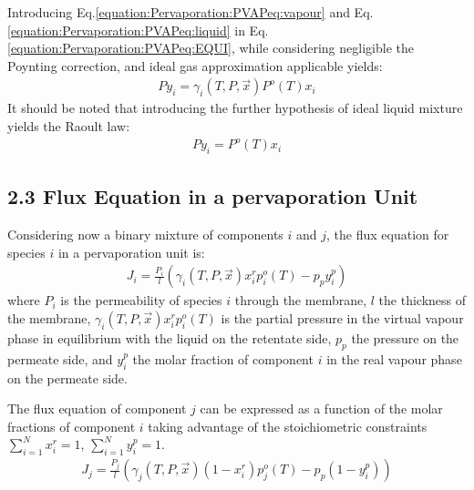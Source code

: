 \documentclass[letterpaper,10pt,english]{jupyterBook}
\begin{document}
\sphinxAtStartPar
Introducing Eq.\eqref{equation:Pervaporation:PVAPeq:vapour} and Eq. \eqref{equation:Pervaporation:PVAPeq:liquid} in Eq.\eqref{equation:Pervaporation:PVAPeq:EQUI}, while considering negligible the Poynting correction, and ideal gas approximation applicable yields:
\begin{equation}\label{equation:Pervaporation:PVAPeq:final}
\begin{split}
Py_i=\gamma_i(T,P,\vec{x})P^o(T)x_i
\end{split}
\end{equation}
\sphinxAtStartPar
It should be noted that introducing the further hypothesis of ideal liquid mixture yields the Raoult law:
\begin{equation}\label{equation:Pervaporation:PVAPeq:Raoult}
\begin{split}
Py_i=P^o(T)x_i
\end{split}
\end{equation}

\subsection{2.3 Flux Equation in a pervaporation Unit}
\label{\detokenize{Pervaporation:flux-equation-in-a-pervaporation-unit}}
\sphinxAtStartPar
Considering now a binary mixture of components \(i\) and \(j\), the flux equation for species \(i\) in a pervaporation unit is:
\begin{equation}\label{equation:Pervaporation:PVAPeq:flux}
\begin{split}
J_i=\frac{P_i}{l}\left(\gamma_i(T,P,\vec{x})x^r_ip_i^o(T)-p_py^p_i\right)
\end{split}
\end{equation}
\sphinxAtStartPar
where \(P_i\) is the permeability of species \(i\) through the membrane, \(l\) the thickness of the membrane, \(\gamma_i(T,P,\vec{x})x^r_ip_i^o(T)\) is the partial pressure in the virtual vapour phase in equilibrium with the liquid on the retentate side, \(p_p\) the pressure on the permeate side, and \(y^p_i\) the molar fraction of component \(i\) in the real vapour phase on the permeate side.

\sphinxAtStartPar
The flux equation of component \(j\) can be expressed as a function of the molar fractions of component \(i\) taking advantage of the stoichiometric constraints \(\sum_{i=1}^{N}x^r_i=1\), \(\sum_{i=1}^{N}y^p_i=1\).
\begin{equation}\label{equation:Pervaporation:PVAPeq:flux2}
\begin{split}
J_j=\frac{P_j}{l}\left(\gamma_j(T,P,\vec{x})(1-x^r_i)p_j^o(T)-p_p(1-y^p_i)\right)
\end{split}
\end{equation}
\sphinxstepscope
\end{document}
